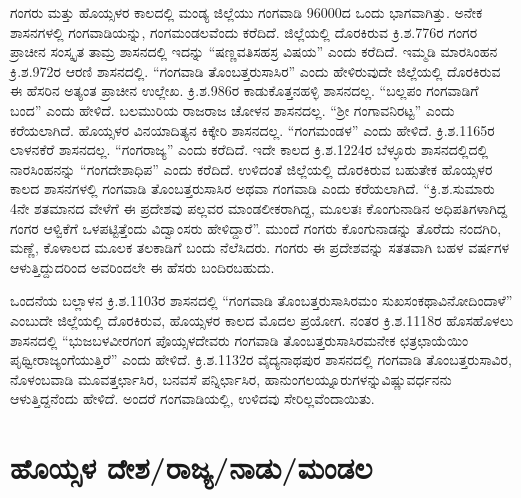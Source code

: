 ಗಂಗರು ಮತ್ತು ಹೊಯ್ಸಳರ ಕಾಲದಲ್ಲಿ ಮಂಡ್ಯ ಜಿಲ್ಲೆಯು ಗಂಗವಾಡಿ 96000ದ ಒಂದು ಭಾಗವಾಗಿತ್ತು. ಅನೇಕ ಶಾಸನಗಳಲ್ಲಿ ಗಂಗವಾಡಿಯನ್ನು, ಗಂಗಮಂಡಲವೆಂದು ಕರೆದಿದೆ. ಜಿಲ್ಲೆಯಲ್ಲಿ ದೊರಕಿರುವ ಕ್ರಿ.ಶ.776ರ ಗಂಗರ ಪ್ರಾಚೀನ ಸಂಸ್ಕೃತ ತಾಮ್ರ ಶಾಸನದಲ್ಲಿ ಇದನ್ನು “ಷಣ್ಣವತಿಸಹಸ್ರ ವಿಷಯ” ಎಂದು ಕರೆದಿದೆ. ಇಮ್ಮಡಿ ಮಾರಸಿಂಹನ ಕ್ರಿ.ಶ.972ರ ಆರಣಿ ಶಾಸನ\-ದಲ್ಲಿ. “ಗಂಗವಾಡಿ ತೊಂಬತ್ತರುಸಾಸಿರ” ಎಂದು ಹೇಳಿರುವುದೇ ಜಿಲ್ಲೆಯಲ್ಲಿ ದೊರಕಿರುವ ಈ ಹೆಸರಿನ ಅತ್ಯಂತ ಪ್ರಾಚೀನ ಉಲ್ಲೇಖ. ಕ್ರಿ.ಶ.986ರ ಕಾಡುಕೊತ್ತನಹಳ್ಳಿ ಶಾಸನದಲ್ಲ. “ಬಲ್ಲಪಂ ಗಂಗವಾಡಿಗೆ ಬಂದ” ಎಂದು ಹೇಳಿದೆ. ಬಲಮುರಿಯ ರಾಜರಾಜ ಚೋಳನ ಶಾಸನದಲ್ಲ. “ಶ‍್ರೀ ಗಂಗಾವನಿರಟ್ಟ” ಎಂದು ಕರೆಯಲಾಗಿದೆ. ಹೊಯ್ಸಳರ ವಿನಯಾದಿತ್ಯನ ಕಿಕ್ಕೇರಿ ಶಾಸನದಲ್ಲ. “ಗಂಗಮಂಡಳ” ಎಂದು ಹೇಳಿದೆ. ಕ್ರಿ.ಶ.1165ರ ಲಾಳನಕೆರೆ ಶಾಸನದಲ್ಲ. “ಗಂಗರಾಜ್ಯ” ಎಂದು ಕರೆದಿದೆ. ಇದೇ ಕಾಲದ ಕ್ರಿ.ಶ.1224ರ ಬೆಳ್ಳೂರು ಶಾಸನದಲ್ಲಿದಲ್ಲಿ ನಾರಸಿಂಹನನ್ನು “ಗಂಗದೇಶಾಧಿಪ” ಎಂದು ಕರೆದಿದೆ. ಉಳಿದಂತೆ ಜಿಲ್ಲೆಯಲ್ಲಿ ದೊರಕಿರುವ ಬಹುತೇಕ ಹೊಯ್ಸಳರ ಕಾಲದ ಶಾಸನಗಳಲ್ಲಿ ಗಂಗವಾಡಿ ತೊಂಬತ್ತರುಸಾಸಿರ ಅಥವಾ ಗಂಗವಾಡಿ ಎಂದು ಕರೆಯಲಾಗಿದೆ. “ಕ್ರಿ.ಶ.ಸುಮಾರು 4ನೇ ಶತಮಾನದ ವೇಳೆಗೆ ಈ ಪ್ರದೇಶವು ಪಲ್ಲವರ ಮಾಂಡಲೀಕರಾಗಿದ್ದ, ಮೂಲತಃ ಕೊಂಗುನಾಡಿನ ಅಧಿಪತಿಗಳಾಗಿದ್ದ ಗಂಗರ ಆಳ್ವಿಕೆಗೆ ಒಳಪಟ್ಟಿತ್ತೆಂದು ವಿದ್ವಾಂಸರು ಹೇಳಿದ್ದಾರೆ”. ಮುಂದೆ ಗಂಗರು ಕೊಂಗುನಾಡನ್ನು ತೊರೆದು ನಂದಗಿರಿ, ಮಣ್ಣೆ, ಕೊಳಾಲದ ಮೂಲಕ ತಲಕಾಡಿಗೆ ಬಂದು ನೆಲೆಸಿದರು. ಗಂಗರು ಈ ಪ್ರದೇಶವನ್ನು ಸತತವಾಗಿ ಬಹಳ ವರ್ಷಗಳ ಆಳುತ್ತಿದ್ದುದರಿಂದ ಅವರಿಂದಲೇ ಈ ಹೆಸರು ಬಂದಿರಬಹುದು.

ಒಂದನೆಯ ಬಲ್ಲಾಳನ ಕ್ರಿ.ಶ.1103ರ ಶಾಸನದಲ್ಲಿ “ಗಂಗವಾಡಿ ತೊಂಬತ್ತರುಸಾಸಿರಮಂ ಸುಖಸಂಕಥಾ\break ವಿನೋದಿಂದಾಳೆ” ಎಂಬುದೇ ಜಿಲ್ಲೆಯಲ್ಲಿ ದೊರಕಿರುವ, ಹೊಯ್ಸಳರ ಕಾಲದ ಮೊದಲ ಪ್ರಯೋಗ. ನಂತರ ಕ್ರಿ.ಶ.1118ರ ಹೊಸಹೊಳಲು ಶಾಸನದಲ್ಲಿ “ಭುಜಬಳವೀರಗಂಗ ಪೊಯ್ಸಳದೇವರು ಗಂಗವಾಡಿ ತೊಂಬತ್ತರುಸಾಸಿರಮನೇಕ ಛತ್ರ\break ಛಾಯೆಯಿಂ ಪೃಥ್ವೀರಾಜ್ಯಂಗೆಯುತ್ತಿರೆ” ಎಂದು ಹೇಳಿದೆ. ಕ್ರಿ.ಶ.1132ರ ವೈದ್ಯನಾಥಪುರ ಶಾಸನದಲ್ಲಿ ಗಂಗವಾಡಿ ತೊಂಬತ್ತರುಸಾವಿರ, ನೊಳಂಬವಾಡಿ ಮೂವತ್ತರ್ಛಾಸಿರ, ಬನವಸೆ ಪನ್ನಿರ್ಛಾಸಿರ, ಹಾನುಂಗಲಯ್ನೂರುಗಳನ್ನು\break ವಿಷ್ಣುವರ್ಧನನು ಆಳುತ್ತಿದ್ದನೆಂದು ಹೇಳಿದೆ. ಅಂದರೆ ಗಂಗವಾಡಿಯಲ್ಲಿ, ಉಳಿದವು ಸೇರಿಲ್ಲವೆಂದಾಯಿತು.

\section*{ಹೊಯ್ಸಳ ದೇಶ/ರಾಜ್ಯ/ನಾಡು/ಮಂಡಲ}

